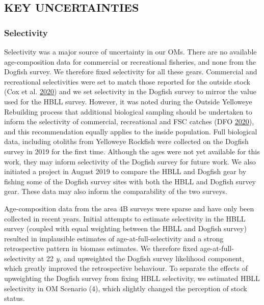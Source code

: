\documentclass[11pt]{book}
\begin{document}
\hypertarget{sec:discussion-uncertainties}{%
\subsection{KEY UNCERTAINTIES}\label{sec:discussion-uncertainties}}

\hypertarget{sec:discussion-uncertainties-selectivity}{%
\subsubsection{Selectivity}\label{sec:discussion-uncertainties-selectivity}}

Selectivity was a major source of uncertainty in our OMs. There are no available age-composition data for commercial or recreational fisheries, and none from the Dogfish survey. We therefore fixed selectivity for all these gears. Commercial and recreational selectivities were set to match those reported for the outside stock (Cox et al. \protect\hyperlink{ref-cox2020}{2020}) and we set selectivity in the Dogfish survey to mirror the value used for the HBLL survey. However, it was noted during the Outside Yelloweye Rebuilding process that additional biological sampling should be undertaken to inform the selectivity of commercial, recreational and FSC catches (DFO \protect\hyperlink{ref-dfo2020}{2020}), and this recommendation equally applies to the inside population. Full biological data, including otoliths from Yelloweye Rockfish were collected on the Dogfish survey in 2019 for the first time. Although the ages were not yet available for this work, they may inform selectivity of the Dogfish survey for future work. We also initiated a project in August 2019 to compare the HBLL and Dogfish gear by fishing some of the Dogfish survey sites with both the HBLL and Dogfish survey gear. These data may also inform the comparability of the two surveys.

Age-composition data from the area 4B surveys were sparse and have only been collected in recent years. Initial attempts to estimate selectivity in the HBLL survey (coupled with equal weighting between the HBLL and Dogfish survey) resulted in implausible estimates of age-at-full-selectivity and a strong retrospective pattern in biomass estimates. We therefore fixed age-at-full-selectivity at 22 \emph{y}, and upweighted the Dogfish survey likelihood component, which greatly improved the retrospective behaviour. To separate the effects of upweighting the Dogfish survey from fixing HBLL selectivity, we estimated HBLL selectivity in OM Scenario (4), which slightly changed the perception of stock status.
\end{document}
